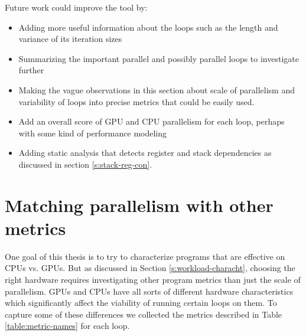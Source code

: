 \documentclass[12pt,twoside]{reedthesis}
\begin{document}
		Future work could improve the tool by:
		
		\begin{itemize}
			\item Adding more useful information about the loops such as the length and variance of its iteration sizes
			\item Summarizing the important parallel and possibly parallel loops to investigate further
			\item Making the vague observations in this section about scale of parallelism and variability of loops into precise metrics that could be easily used. 
			\item  Add an overall score of GPU and CPU parallelism for each loop, perhaps with some kind of performance modeling
			\item  Adding static analysis that detects register and stack dependencies as discussed in  section \ref{s:stack-reg-con}.
		\end{itemize} 
	
	\section{Matching parallelism with other metrics}
	
		One goal of this thesis is to try to characterize programs that are effective on CPUs vs. GPUs. But as discussed in Section \ref{s:workload-characht}, choosing the right hardware requires investigating other program metrics than just the scale of parallelism. GPUs and CPUs have all sorts of different hardware characteristics which significantly affect the viability of running certain loops on them. %
		To capture some of these differences we collected the metrics described in Table \ref{table:metric-names} for each loop.
		
\end{document}
